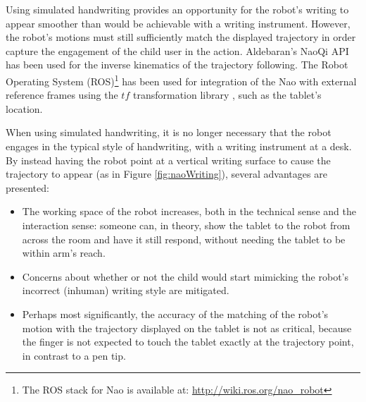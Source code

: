 \documentclass{sig-alternate}
\begin{document}
Using simulated handwriting provides an opportunity for the robot's writing to
appear smoother than would be achievable with a writing instrument. However, the
robot's motions must still sufficiently match the displayed trajectory in order
capture the engagement of the child user in the action. Aldebaran's NaoQi API
has been used for the inverse kinematics of the trajectory following. The Robot
Operating System (ROS)\footnote{The ROS stack for Nao is available at:
\url{http://wiki.ros.org/nao_robot}} has been used for integration of the Nao
with external reference frames using the $tf$ transformation library
\cite{Foote2013}, such as the tablet's location.

When using simulated handwriting, it is no longer necessary that the robot
engages in the typical style of handwriting, with a writing instrument at a desk.
By instead having the robot point at a vertical writing surface to cause the
trajectory to appear (as in Figure \ref{fig:naoWriting}), several advantages are
presented:

\begin{itemize}

    \item The working space of the robot increases, both in the technical sense
        and the interaction sense: someone can, in theory, show the tablet to
        the robot from across the room and have it still respond, without
        needing the tablet to be within arm's reach.

    \item Concerns about whether or not the child would start mimicking the
        robot's incorrect (inhuman) writing style are mitigated. %
%
%

    \item Perhaps most significantly, the accuracy of the matching of the
        robot's motion with the trajectory displayed on the tablet is not as
        critical, because the finger is not expected to touch the tablet exactly
        at the trajectory point, in contrast to a pen tip.

\end{itemize}
\end{document}
